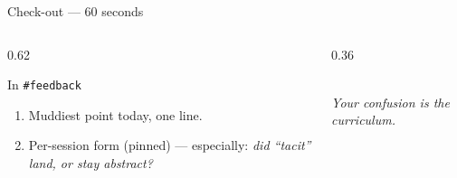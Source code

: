 \documentclass[aspectratio=169,11pt]{beamer}
\begin{document}
\begin{frame}{Check-out --- 60 seconds}
  \begin{columns}[T]
    \begin{column}{0.62\textwidth}
      \begin{block}{In \texttt{\#feedback}}
        \begin{enumerate}\small
          \item Muddiest point today, one line.
          \item Per-session form (pinned) --- especially: \emph{did ``tacit''
            land, or stay abstract?}
        \end{enumerate}
      \end{block}
    \end{column}
    \begin{column}{0.36\textwidth}
      \begin{center}\gwflagicon\\[3pt]
      {\footnotesize\color{attackcol}\itshape Your confusion is the curriculum.}
      \end{center}
    \end{column}
  \end{columns}
\end{frame}

\end{document}
